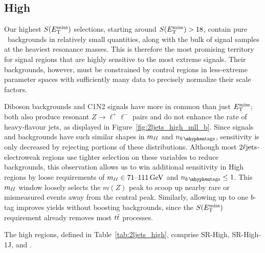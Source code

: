 \subsection{High}
\label{sec:2ljets_high}
Our highest $\metsig$ selections, starting around $\metsig > 18$, contain
pure \diboson\ backgrounds in relatively small quantities, along with the bulk
of signal samples at the heaviest resonance masses.
This is therefore the most promising territory for signal regions that are
highly sensitive to the most extreme signals.
Their backgrounds, however, must be constrained by control regions in
less-extreme parameter spaces with sufficiently many data to precisely
normalize their scale factors.

Diboson backgrounds and C1N2 signals have more in common than just $\met$;
both also produce resonant $Z\to \ell^+\ell^-$ pairs
and do not enhance the rate of heavy-flavour jets, as displayed in
Figure~\ref{fig:2ljets_high_mll_b}.
Since signals and backgrounds have such similar shapes in $\mll$ and $\nbtag$,
sensitivity is only decreased by rejecting portions of these distributions.
Although most $\twoljets$-electroweak regions use tighter selection on these
variables to reduce backgrounds, this observation allows us to win
additional sensitivity in High regions by loose requirements
of $\mll \in 71\textrm{--}111\,\eV[G]$ and $\nbtag \leq 1$.
This $\mll$ window loosely selects the $m(Z)$ peak to scoop up nearby rare or
mismeasured events away from the central peak.
Similarly, allowing up to one $b$-tag improves yields without boosting
backgrounds, since the $\metsig$ requirement already removes most $\ttbar$
processes.

The high regions, defined in Table~\ref{tab:2ljets_high}, comprise SR-High,
SR-High-1J, and \srllbb.

